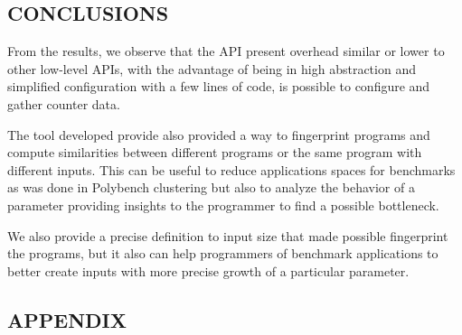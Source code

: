 
\subsection{CONCLUSIONS}

From the results, we observe that the API present overhead similar or lower to other low-level APIs, with the advantage of being in high abstraction and simplified configuration with a few lines of code, is possible to configure and gather counter data.

The tool developed provide also provided a way to fingerprint programs and compute similarities between different programs or the same program with different inputs. This can be useful to reduce applications spaces for benchmarks as was done in Polybench clustering but also to analyze the behavior of a parameter providing insights to the programmer to find a possible bottleneck.

We also provide a precise definition to input size that made possible fingerprint the programs, but it also can help programmers of benchmark applications to better create inputs with more precise growth of a particular parameter.

%



\subsection{APPENDIX}


